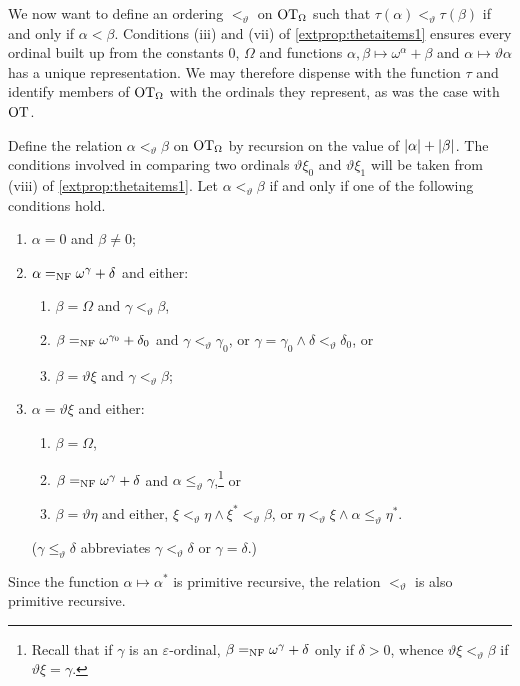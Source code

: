 \documentclass[UKenglish,cleveref,DIV=12]{scrartcl}
\newtheorem{lemma}{Lemma}
\theoremstyle{definition}
\theoremstyle{definition}
\begin{document}
We now want to define an ordering $<_\vartheta$ on $\mathrm{OT}_\Omega$ such that
$\tau(\alpha)<_\vartheta\tau(\beta)$ if and only if $\alpha<\beta$. Conditions
(iii) and (vii) of \cref{extprop:thetaitems1} ensures every ordinal built up
from the constants $0$, $\Omega$ and functions
$\alpha,\beta\mapsto\omega^\alpha+\beta$ and $\alpha\mapsto\vartheta\alpha$ has
a unique representation. We may therefore dispense with the
function $\tau$ and identify members of $\mathrm{OT}_\Omega$ with the ordinals they
represent, as was the case with $\mathrm{OT}$.

Define the relation $\alpha<_\vartheta\beta$ on $\mathrm{OT}_\Omega$ by
recursion on the value of $\lvert{\alpha}\rvert+\lvert{\beta}\rvert$. The conditions involved in
comparing two ordinals $\vartheta\xi_0$ and $\vartheta\xi_1$ will be taken from
(viii) of \cref{extprop:thetaitems1}. Let $\alpha<_\vartheta\beta$ if and only
if one of the following conditions hold.
\begin{enumerate}
 \item $\alpha=0$ and $\beta\neq0$;
 \item $\alpha =_{\mathrm{NF}}\omega^\gamma+\delta$ and either:
 \begin{enumerate}
  \item $\beta=\Omega$ and $\gamma<_\vartheta\beta$,
  \item $\beta=_{\mathrm{NF}}\omega^{\gamma_0}+\delta_0$ and $\gamma<_\vartheta\gamma_0$, or $\gamma=\gamma_0\land\delta<_\vartheta\delta_0$, or
  \item $\beta=\vartheta\xi$ and $\gamma<_\vartheta\beta$;
 \end{enumerate}
 \item $\alpha=\vartheta\xi$ and either:
 \begin{enumerate}
  \item $\beta=\Omega$,
  \item $\beta=_{\mathrm{NF}}\omega^{\gamma}+\delta$ and $\alpha\le_\vartheta\gamma$,\footnote{Recall that if $\gamma$ is an $\varepsilon$-ordinal, $\beta=_{\mathrm{NF}}\omega^\gamma+\delta$ only if $\delta>0$, whence $\vartheta\xi<_\vartheta\beta$ if $\vartheta\xi=\gamma$.} or
  \item $\beta=\vartheta\eta$ and either, $\xi<_\vartheta\eta\land \xi^*<_\vartheta\beta$, or $\eta<_\vartheta\xi\land\alpha\le_\vartheta\eta^*$.
 \end{enumerate}
($\gamma\le_\vartheta\delta$ abbreviates $\gamma<_\vartheta\delta$ or $\gamma=\delta$.)
\end{enumerate}
Since the function $\alpha\mapsto\alpha^*$ is primitive recursive, the relation $<_\vartheta$ is also primitive recursive.
\end{document}
